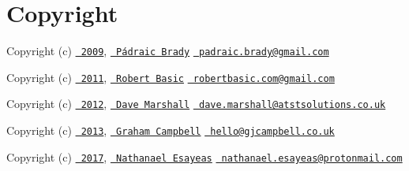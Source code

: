 \chapter{Copyright}
\hypertarget{md_vendor_2mockery_2mockery_2_c_o_p_y_r_i_g_h_t}{}\label{md_vendor_2mockery_2mockery_2_c_o_p_y_r_i_g_h_t}
\label{md_vendor_2mockery_2mockery_2_c_o_p_y_r_i_g_h_t_autotoc_md1144}%
%

\begin{DoxyItemize}
\item Copyright (c) \href{https://github.com/mockery/mockery/commit/1d96f88142abe804ab9e893a5f07933f63e9bff9}{\texttt{ 2009}}, \href{https://github.com/padraic}{\texttt{ Pádraic Brady}} \href{mailto:padraic.brady@gmail.com}{\texttt{ padraic.\+brady@gmail.\+com}}
\item Copyright (c) \href{https://github.com/mockery/mockery/commit/94dbb63aab37c659f63ea6e34acc6958928b0f59}{\texttt{ 2011}}, \href{https://github.com/robertbasic}{\texttt{ Robert Basic}} \href{mailto:robertbasic.com@gmail.com}{\texttt{ robertbasic.\+com@gmail.\+com}}
\item Copyright (c) \href{https://github.com/mockery/mockery/commit/64e3ad6960eb3202b5b91b91a4ef1cf6252f0fef}{\texttt{ 2012}}, \href{https://github.com/davedevelopment}{\texttt{ Dave Marshall}} \href{mailto:dave.marshall@atstsolutions.co.uk}{\texttt{ dave.\+marshall@atstsolutions.\+co.\+uk}}
\item Copyright (c) \href{https://github.com/mockery/mockery/commit/270ddd0bd051251e36a5688c52fc2638a097b110}{\texttt{ 2013}}, \href{https://github.com/GrahamCampbell}{\texttt{ Graham Campbell}} \href{mailto:hello@gjcampbell.co.uk}{\texttt{ hello@gjcampbell.\+co.\+uk}}
\item Copyright (c) \href{https://github.com/mockery/mockery/commit/ba28b84c416b95924886bbd64a6a2f68e863536a}{\texttt{ 2017}}, \href{https://github.com/ghostwriter}{\texttt{ Nathanael Esayeas}} \href{mailto:nathanael.esayeas@protonmail.com}{\texttt{ nathanael.\+esayeas@protonmail.\+com}} 
\end{DoxyItemize}